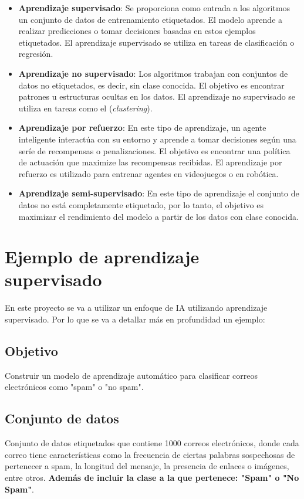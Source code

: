 \begin{itemize}
\item \textbf{Aprendizaje supervisado}: Se proporciona como entrada a los algoritmos un conjunto de datos de entrenamiento etiquetados. El modelo aprende a realizar predicciones o tomar decisiones basadas en estos ejemplos etiquetados. El aprendizaje supervisado se utiliza en tareas de clasificación o regresión.

\item \textbf{Aprendizaje no supervisado}: Los algoritmos trabajan con conjuntos de datos no etiquetados, es decir, sin clase conocida. El objetivo es encontrar patrones u estructuras ocultas en los datos. El aprendizaje no supervisado se utiliza en tareas como el (\textit{clustering}).

\item \textbf{Aprendizaje por refuerzo}: En este tipo de aprendizaje, un agente inteligente interactúa con su entorno y aprende a tomar decisiones según una seríe de recompensas o penalizaciones. El objetivo es encontrar una política de actuación que maximize las recompensas recibidas. El aprendizaje por refuerzo es utilizado para entrenar agentes en videojuegos o en robótica.

\item \textbf{Aprendizaje semi-supervisado}: En este tipo de aprendizaje el conjunto de datos no está completamente etiquetado, por lo tanto, el objetivo es maximizar el rendimiento del modelo a partir de los datos con clase conocida.
\end{itemize}

\section{Ejemplo de aprendizaje supervisado}

En este proyecto se va a utilizar un enfoque de IA utilizando aprendizaje supervisado. Por lo que se va a detallar más en profundidad un ejemplo:

\subsection{Objetivo}
Construir un modelo de aprendizaje automático para clasificar correos electrónicos como "spam" o "no spam".

\subsection{Conjunto de datos}
Conjunto de datos etiquetados que contiene 1000 correos electrónicos, donde cada correo tiene características como la frecuencia de ciertas palabras sospechosas de pertenecer a spam, la longitud del mensaje, la presencia de enlaces o imágenes, entre otros. \textbf{Además de incluir la clase a la que pertenece: "Spam" o "No Spam"}.

